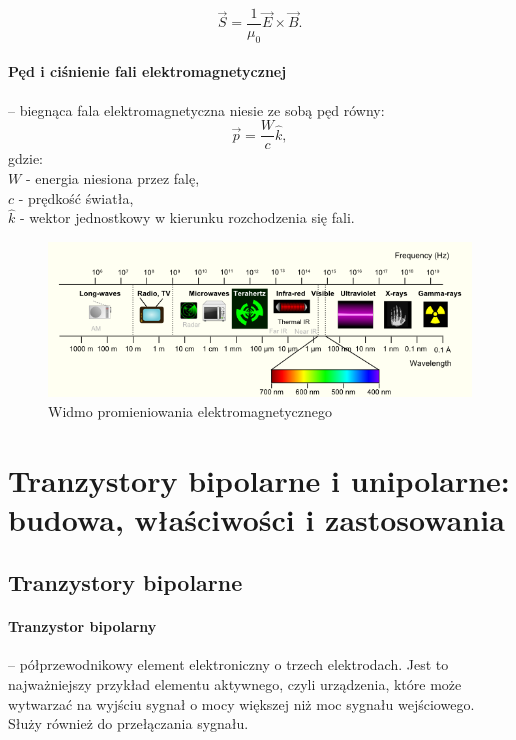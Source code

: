 \documentclass[a4paper,twoside]{report}
\begin{document}
\begin{equation}
\overrightarrow{S} = \dfrac{1}{\mu _0} \overrightarrow{E} \times \overrightarrow{B}.
\end{equation}

\paragraph{Pęd i ciśnienie fali elektromagnetycznej} – biegnąca fala elektromagnetyczna niesie ze sobą pęd równy:
\begin{equation}
\overrightarrow{p} = \dfrac{W}{c} \hat{k},
\end{equation}
gdzie: \\
$W$ - energia niesiona przez falę,\\
$c$ - prędkość światła,\\
$\hat{k}$ - wektor jednostkowy w kierunku rozchodzenia się fali.

\begin{figure}[htbp]
\centering
\includegraphics[width=\linewidth]{obrazy/spectrum.png}
\caption{Widmo promieniowania elektromagnetycznego}
\label{rys:widmo}
\end{figure}

\section{Tranzystory bipolarne i unipolarne: budowa, właściwości i zastosowania}

\subsection{Tranzystory bipolarne}  
\paragraph{Tranzystor bipolarny} – półprzewodnikowy element elektroniczny o trzech elektrodach. Jest to najważniejszy przykład elementu aktywnego, czyli urządzenia, które może wytwarzać na wyjściu sygnał o mocy większej niż moc sygnału wejściowego. Służy również do przełączania sygnału.
\end{document}
